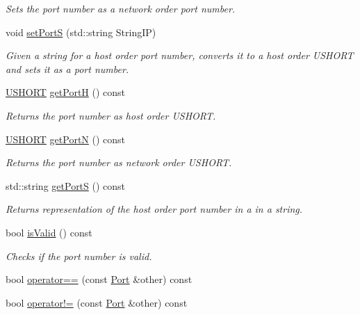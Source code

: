 \begin{DoxyCompactItemize}
\begin{DoxyCompactList}\small\item\em Sets the port number as a network order port number. \end{DoxyCompactList}\item 
void \hyperlink{class_communication_1_1_port_adf4eb454c18e39aca860aa530fb02cb1}{set\+Port\+S} (std\+::string String\+I\+P)
\begin{DoxyCompactList}\small\item\em Given a string for a host order port number, converts it to a host order U\+S\+H\+O\+R\+T and sets it as a port number. \end{DoxyCompactList}\item 
\hyperlink{typedefs_8h_a5b86282b5437f326bad1198f30248a54}{U\+S\+H\+O\+R\+T} \hyperlink{class_communication_1_1_port_aced2e6a97ef18d79cb86d81fdd8d71e9}{get\+Port\+H} () const 
\begin{DoxyCompactList}\small\item\em Returns the port number as host order U\+S\+H\+O\+R\+T. \end{DoxyCompactList}\item 
\hyperlink{typedefs_8h_a5b86282b5437f326bad1198f30248a54}{U\+S\+H\+O\+R\+T} \hyperlink{class_communication_1_1_port_adf58b6023f5878d4ac5c3a49431e26de}{get\+Port\+N} () const 
\begin{DoxyCompactList}\small\item\em Returns the port number as network order U\+S\+H\+O\+R\+T. \end{DoxyCompactList}\item 
std\+::string \hyperlink{class_communication_1_1_port_a00ca90bb3c6e6827ee95a2fb3a77a995}{get\+Port\+S} () const 
\begin{DoxyCompactList}\small\item\em Returns representation of the host order port number in a in a string. \end{DoxyCompactList}\item 
bool \hyperlink{class_communication_1_1_port_a8155e8e12d0f28d31c83ddc1f3eaeefc}{is\+Valid} () const 
\begin{DoxyCompactList}\small\item\em Checks if the port number is valid. \end{DoxyCompactList}\item 
bool \hyperlink{class_communication_1_1_port_a8d3329e119c8d26914f915904b6c6880}{operator==} (const \hyperlink{class_communication_1_1_port}{Port} \&other) const 
\item 
bool \hyperlink{class_communication_1_1_port_aeb3f1452a32089d1b6bdddaeeee61693}{operator!=} (const \hyperlink{class_communication_1_1_port}{Port} \&other) const 
\end{DoxyCompactItemize}
